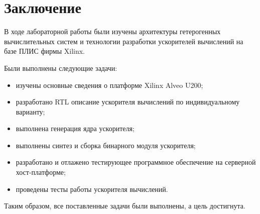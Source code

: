 \chapter*{Заключение}

В ходе лабораторной работы были изучены архитектуры гетерогенных вычислительных
систем и технологии разработки ускорителей вычислений на базе ПЛИС фирмы
Xilinx.

Были выполнены следующие задачи:
\begin{itemize}
    \item изучены основные сведения о платформе Xilinx Alveo U200;
    \item разработано RTL описание ускорителя вычислений по индивидуальному
          варианту;
    \item выполнена генерация ядра ускорителя;
    \item выполнены синтез и сборка бинарного модуля ускорителя;
    \item разработано и отлажено тестирующее программное обеспечение на
          серверной хост-платформе;
    \item проведены тесты работы ускорителя вычислений.
\end{itemize}

Таким образом, все поставленные задачи были выполнены, а цель достигнута.
